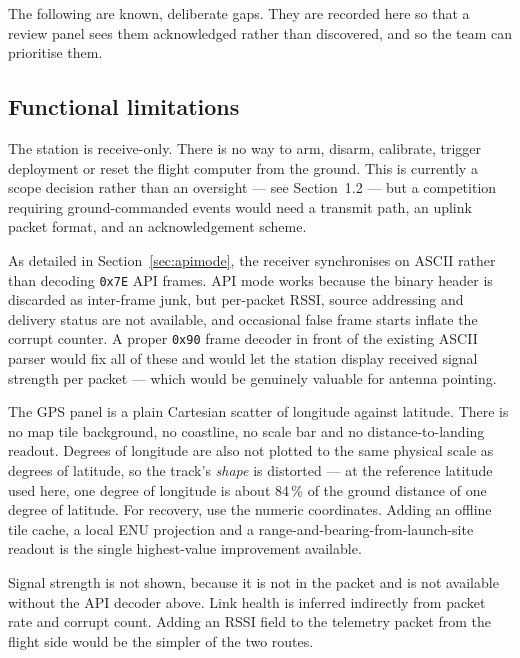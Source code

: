 \documentclass[11pt,a4paper]{article}
\newcommand{\code}[1]{\texttt{#1}}
\begin{document}
The following are known, deliberate gaps. They are recorded here so that a
review panel sees them acknowledged rather than discovered, and so the team
can prioritise them.

\subsection{Functional limitations}

\begin{description}[leftmargin=0mm,labelwidth=0mm,labelsep=0mm,style=nextline,font=\normalfont\bfseries]

\item[No command uplink.] The station is receive-only. There is no way to
arm, disarm, calibrate, trigger deployment or reset the flight computer from
the ground. This is currently a scope decision rather than an oversight ---
see Section~1.2 --- but a competition requiring ground-commanded events would
need a transmit path, an uplink packet format, and an acknowledgement scheme.

\item[No native 802.15.4 API frame decoder.] As detailed in
Section~\ref{sec:apimode}, the receiver synchronises on ASCII rather than
decoding \code{0x7E} API frames. API mode works because the binary header is
discarded as inter-frame junk, but per-packet RSSI, source addressing and
delivery status are not available, and occasional false frame starts inflate
the corrupt counter. A proper \code{0x90} frame decoder in front of the
existing ASCII parser would fix all of these and would let the station
display received signal strength per packet --- which would be genuinely
valuable for antenna pointing.

\item[Ground track is not a map.] The GPS panel is a plain Cartesian scatter
of longitude against latitude. There is no map tile background, no coastline,
no scale bar and no distance-to-landing readout. Degrees of longitude are also
not plotted to the same physical scale as degrees of latitude, so the track's
\emph{shape} is distorted --- at the reference latitude used here, one degree
of longitude is about 84\,\% of the ground distance of one degree of latitude.
For recovery, use the numeric coordinates. Adding an offline tile cache, a
local ENU projection and a range-and-bearing-from-launch-site readout is the
single highest-value improvement available.

\item[No RSSI or link margin display.] Signal strength is not shown, because
it is not in the packet and is not available without the API decoder above.
Link health is inferred indirectly from packet rate and corrupt count. Adding
an RSSI field to the telemetry packet from the flight side would be the
simpler of the two routes.


\end{description}
\end{document}
